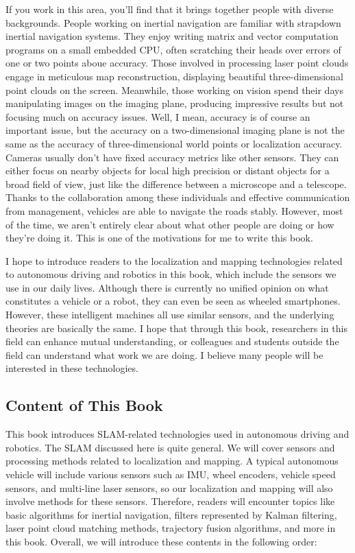 If you work in this area, you'll find that it brings together people with diverse backgrounds. People working on inertial navigation are familiar with strapdown inertial navigation systems. They enjoy writing matrix and vector computation programs on a small embedded CPU, often scratching their heads over errors of one or two points aboue accuracy. Those involved in processing laser point clouds engage in meticulous map reconstruction, displaying beautiful three-dimensional point clouds on the screen. Meanwhile, those working on vision spend their days manipulating images on the imaging plane, producing impressive results but not focusing much on accuracy issues. Well, I mean, accuracy is of course an important issue, but the accuracy on a two-dimensional imaging plane is not the same as the accuracy of three-dimensional world points or localization accuracy. Cameras usually don't have fixed accuracy metrics like other sensors. They can either focus on nearby objects for local high precision or distant objects for a broad field of view, just like the difference between a microscope and a telescope. Thanks to the collaboration among these individuals and effective communication from management, vehicles are able to navigate the roads stably. However, most of the time, we aren't entirely clear about what other people are doing or how they're doing it. This is one of the motivations for me to write this book.


I hope to introduce readers to the localization and mapping technologies related to autonomous driving and robotics in this book, which include the sensors we use in our daily lives. Although there is currently no unified opinion on what constitutes a vehicle or a robot, they can even be seen as wheeled smartphones. However, these intelligent machines all use similar sensors, and the underlying theories are basically the same. I hope that through this book, researchers in this field can enhance mutual understanding, or colleagues and students outside the field can understand what work we are doing. I believe many people will be interested in these technologies.

\subsection*{Content of This Book}
This book introduces SLAM-related technologies used in autonomous driving and robotics. The SLAM discussed here is quite general. We will cover sensors and processing methods related to localization and mapping. A typical autonomous vehicle will include various sensors such as IMU, wheel encoders, vehicle speed sensors, and multi-line laser sensors, so our localization and mapping will also involve methods for these sensors. Therefore, readers will encounter topics like basic algorithms for inertial navigation, filters represented by Kalman filtering, laser point cloud matching methods, trajectory fusion algorithms, and more in this book. Overall, we will introduce these contents in the following order:

